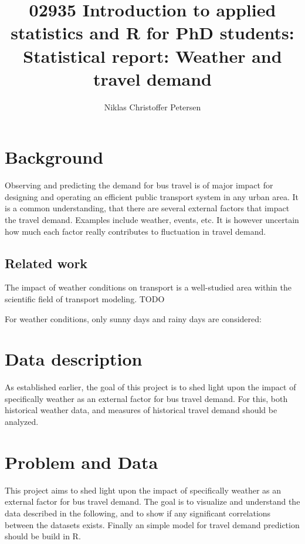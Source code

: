 \documentclass[a4paper,11pt]{article}
\title{{\small 02935 Introduction to applied statistics and R for PhD students: }\\[1em]Statistical report: Weather and travel demand}
\author{Niklas Christoffer Petersen}
\affil{Transport Modelling, Department of Management Engineering \\ Technical University of Denmark, 2800 Kongens Lyngby, Denmark}
\begin{document}
\singlespace
\maketitle
\thispagestyle{empty}
\clearpage

\onehalfspacing
{}
\tableofcontents
\clearpage
\glsaddall
\printglossaries


\clearpage

\section{Background}\label{ch:background}

Observing and predicting the demand for bus travel is of major impact for designing and operating an efficient public transport system in any urban area. It is a common understanding, that there are several external factors that impact the travel demand. Examples include weather, events, etc. It is however uncertain how much each factor really contributes to fluctuation in travel demand. 

\subsection{Related work}\label{ch:relatedWork}
The impact of weather conditions on transport is a well-studied area within the scientific field of transport modeling.
TODO

For weather conditions, only sunny days and rainy days are considered: \citet{Yo2010}

\clearpage

\section{Data description}\label{ch:desc}
As established earlier, the goal of this project is to shed light upon the impact of specifically weather as an external factor for bus travel demand. For this, both historical weather data, and measures of historical travel demand should be analyzed.


\clearpage


\clearpage


\clearpage


\clearpage

\section{Problem and Data}\label{ch:data_old}
This project aims to shed light upon the impact of specifically weather as an external factor for bus travel demand. The goal is to visualize and understand the data described in the following, and to show if any significant correlations between the datasets exists. Finally an simple model for travel demand prediction should be build in R.
\end{document}
